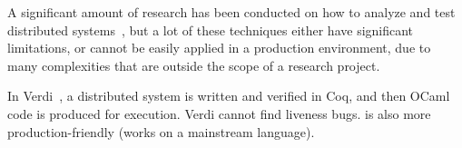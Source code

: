 A significant amount of research has been conducted on how to analyze and test distributed systems~\cite{lamport1994temporal, schuppan2004efficient, killian2007life, gupta2008diecast, yang2009modist}, but a lot of these techniques either have significant limitations, or cannot be easily applied in a production environment, due to many complexities that are outside the scope of a research project.

In Verdi~\cite{wilcox2015verdi}, a distributed system is written and verified in Coq, and then OCaml code is produced for execution. Verdi cannot find liveness bugs. \psharp is also more production-friendly (works on a mainstream language). 
